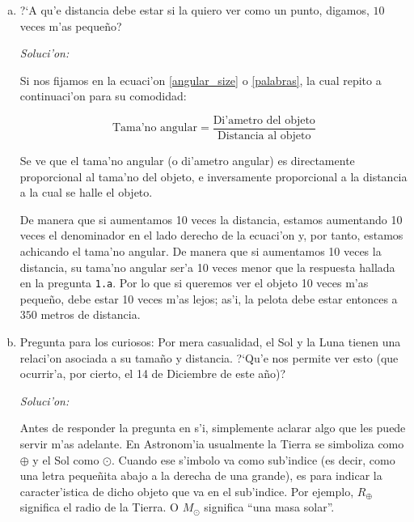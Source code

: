 \documentclass{article}
\begin{document}
\begin{enumerate} [a)]
\item ?`A qu'e distancia debe estar si la quiero ver como un punto, digamos, $10$ veces m'as pequeño? 

\vspace{2mm}

\textit{Soluci'on:}

\vspace{2mm}

Si nos fijamos en la ecuaci'on \eqref{angular_size} o \eqref{palabras}, la cual repito a continuaci'on para su comodidad:

\begin{equation*}
\text{Tama{'n}o angular} = \frac{\text{Di'ametro del objeto}}{\text{Distancia al objeto}}
\end{equation*}

Se ve que el tama'no angular (o di'ametro angular) es directamente proporcional al tama'no del objeto, e inversamente proporcional a la distancia a la cual se halle el objeto.

De manera que si aumentamos 10 veces la distancia, estamos aumentando 10 veces el denominador en el lado derecho de la ecuaci'on y, por tanto, estamos achicando el tama'no angular. De manera que si aumentamos 10 veces la distancia, su tama'no angular ser'a 10 veces menor que la respuesta hallada en la pregunta \texttt{1.a}. Por lo que si queremos ver el objeto 10 veces m'as pequeño, debe estar 10 veces m'as lejos; as'i, la pelota debe estar entonces a $350$ metros de distancia.
\item Pregunta para los curiosos: Por mera casualidad, el Sol y la Luna tienen una relaci'on asociada a su tamaño y distancia. ?`Qu'e nos permite ver esto (que ocurrir'a, por cierto, el 14 de Diciembre de este año)?

\vspace{2mm}

\textit{Soluci'on:}

\vspace{2mm}

Antes de responder la pregunta en s'i, simplemente aclarar algo que les puede servir m'as adelante. En Astronom'ia usualmente la Tierra se simboliza como $\oplus$ y el Sol como $\odot$. Cuando ese s'imbolo va como sub'indice (es decir, como una letra pequeñita abajo a la derecha de una grande), es para indicar la caracter'istica de dicho objeto que va en el sub'indice. Por ejemplo, $R_{\oplus}$ significa el radio de la Tierra. O $M_{\odot}$ significa ``una masa solar''.


\end{enumerate}
\end{document}
